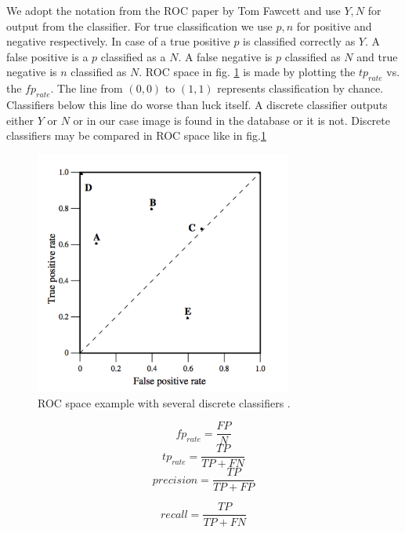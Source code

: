 \documentclass[english,12pt,a4paper,pdftex,elec,utf8]{aaltothesis}
\begin{document}
We adopt the notation from the ROC paper by Tom Fawcett and use ${Y,N}$ for output from the classifier. For true classification we use ${p,n}$ for positive and negative respectively. In case of a true positive $p$ is classified correctly as $Y$. A false positive is a $p$ classified as a $N$. A false negative is $p$ classified as $N$ and true negative is $n$ classified as $N$. ROC space in fig. \ref{figrocspace} is made by plotting the $tp_{rate}$ vs. the $fp_{rate}$. The line from $(0,0)$ to $(1,1)$ represents classification by chance. Classifiers below this line do worse than luck itself. A discrete classifier outputs either $Y$ or $N$ or in our case image is found in the database or it is not. Discrete classifiers may be compared in ROC space like in fig.\ref{figrocspace} \cite{Fawcett2006}

\begin{figure}[htb]
\begin{center}
\includegraphics[height=8cm]{figures/ROC}
\end{center}
\caption{ROC space example with several discrete classifiers \cite{Fawcett2006}. }
\label{figrocspace}
\end{figure}

\begin{equation}\label{FPR}
fp_{rate} = \frac{FP}{N}
\end{equation}
\begin{equation}\label{TPR}
tp_{rate} = \frac{TP}{TP + FN}
\end{equation}
\begin{equation}\label{precision}
precision = \frac{TP}{TP + FP}
\end{equation}

\begin{equation}\label{recall}
recall = \frac{TP}{TP + FN}
\end{equation}
\end{document}
